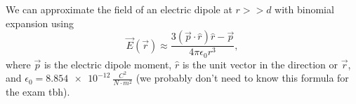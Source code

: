 We can approximate the field of an electric dipole at $r>>d$ with binomial expansion using
\begin{equation}
    \vec{E}(\vec{r}) \approx \frac{3(\vec{p}\cdot \hat{r})\hat{r} - \vec{p}}{4 \pi \epsilon_0 r^3},
\end{equation}
where $\vec{p}$ is the electric dipole moment, $\hat r$ is the unit vector in the direction or $\vec r$, and $\epsilon_0 = \SI{8.854e-12}{\frac{C^2}{N \cdot m^2}}$ (we probably don't need to know this formula for the exam tbh).


